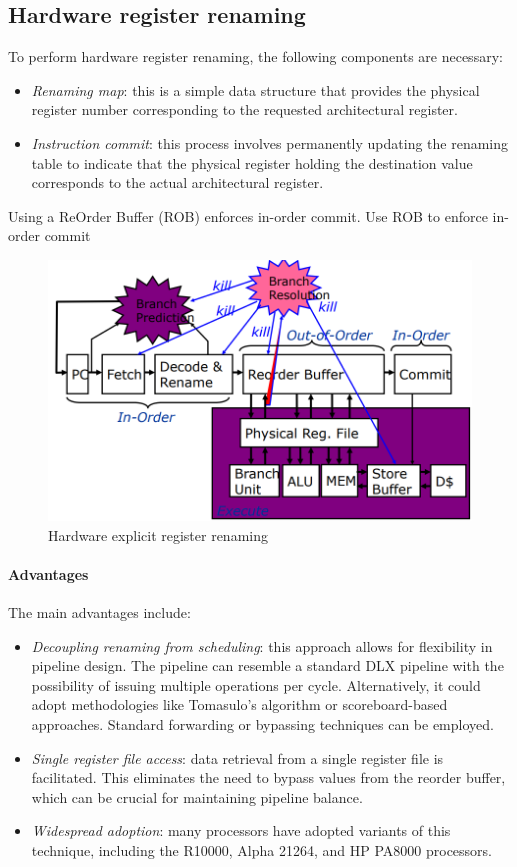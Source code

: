 \subsection{Hardware register renaming}
To perform hardware register renaming, the following components are necessary:
\begin{itemize}
    \item \textit{Renaming map}: this is a simple data structure that provides the physical register number corresponding to the requested architectural register.
    \item \textit{Instruction commit}: this process involves permanently updating the renaming table to indicate that the physical register holding the destination value corresponds to the actual architectural register.
\end{itemize}
Using a ReOrder Buffer (ROB) enforces in-order commit.
Use ROB to enforce in-order commit
\begin{figure}[H]
    \centering
    \includegraphics[width=0.4\linewidth]{images/herr.png}
    \caption{Hardware explicit register renaming}
\end{figure}

\paragraph*{Advantages}
The main advantages include:
\begin{itemize}
    \item \textit{Decoupling renaming from scheduling}: this approach allows for flexibility in pipeline design. 
        The pipeline can resemble a standard DLX pipeline with the possibility of issuing multiple operations per cycle. 
        Alternatively, it could adopt methodologies like Tomasulo's algorithm or scoreboard-based approaches. 
        Standard forwarding or bypassing techniques can be employed.
    \item \textit{Single register file access}: data retrieval from a single register file is facilitated. 
        This eliminates the need to bypass values from the reorder buffer, which can be crucial for maintaining pipeline balance.
    \item \textit{Widespread adoption}: many processors have adopted variants of this technique, including the R10000, Alpha 21264, and HP PA8000 processors.
\end{itemize}

